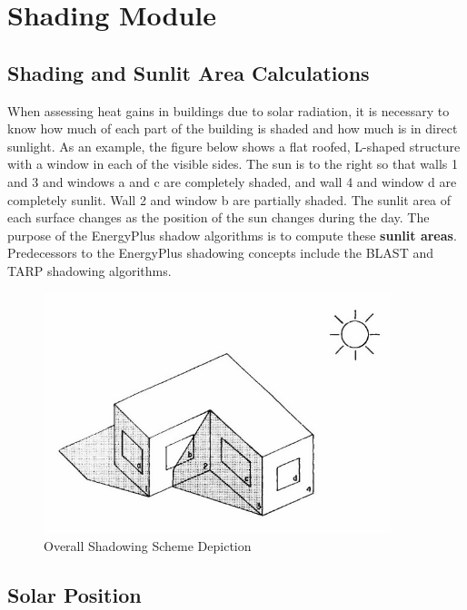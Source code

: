 \section{Shading Module}\label{shading-module}

\subsection{Shading and Sunlit Area Calculations}\label{shading-and-sunlit-area-calculations}

When assessing heat gains in buildings due to solar radiation, it is necessary to know how much of each part of the building is shaded and how much is in direct sunlight. As an example, the figure below shows a flat roofed, L-shaped structure with a window in each of the visible sides. The sun is to the right so that walls 1 and 3 and windows a and c are completely shaded, and wall 4 and window d are completely sunlit. Wall 2 and window b are partially shaded. The sunlit area of each surface changes as the position of the sun changes during the day. The purpose of the EnergyPlus shadow algorithms is to compute these \textbf{sunlit areas}.~ Predecessors to the EnergyPlus shadowing concepts include the BLAST and TARP shadowing algorithms.

\begin{figure}[hbtp] %
\centering
\includegraphics[width=0.9\textwidth, height=0.9\textheight, keepaspectratio=true]{media/image601.png}
\caption{Overall Shadowing Scheme Depiction \protect \label{fig:overall-shadowing-scheme-depiction}}
\end{figure}

\subsection{Solar Position}\label{solar-position}

